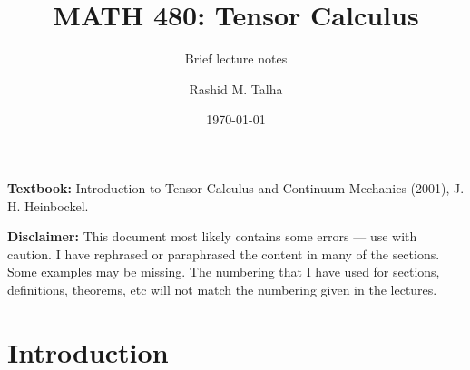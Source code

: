 \documentclass[11pt]{penrose}
\title{MATH 480: Tensor Calculus}
\subtitle{Brief lecture notes}
\author{Rashid M. Talha}
\affiliation{School of Natural Sciences, NUST}
\date{\today}
\begin{document}
\maketitle

\textbf{Textbook:} Introduction to Tensor Calculus and Continuum Mechanics (2001), J. H. Heinbockel.

\textbf{Disclaimer:} This document most likely contains some errors --- use with caution. I have rephrased or paraphrased the content in many of the sections. Some examples may be missing. The numbering that I have used for sections, definitions, theorems, etc will not match the numbering given in the lectures.

\section{Introduction}
\end{document}
